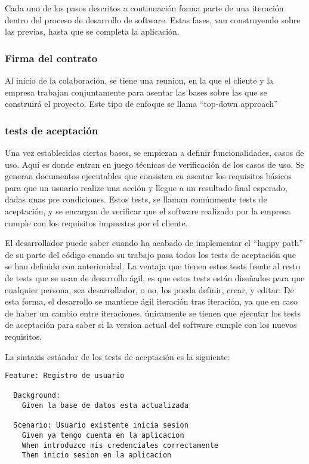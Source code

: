 \documentclass[12pt]{report} %
\begin{document}
Cada uno de los pasos descritos a continuación forma parte de una iteración dentro del proceso de desarrollo de software.
Estas fases, van construyendo sobre las previas, hasta que se completa la aplicación.

\subsubsection{Firma del contrato}

Al inicio de la colaboración, se tiene una reunion, en la que el cliente y la empresa trabajan conjuntamente para asentar las bases sobre las que se construirá el proyecto.
Este tipo de enfoque se llama ``top-down approach'' %

\subsubsection{tests de aceptación}

Una vez establecidas ciertas bases, se empiezan a definir funcionalidades, casos de uso.
Aquí es donde entran en juego técnicas de verificación de los casos de uso.
Se generan documentos ejecutables que consisten en asentar los requisitos básicos para que un usuario realize una acción y llegue a un resultado final esperado, dadas unas pre condiciones.
Estos tests, se llaman comúnmente tests de aceptación, y se encargan de verificar que el software realizado por la empresa cumple con los requisitos impuestos por el cliente.

El desarrollador puede saber cuando ha acabado de implementar el ``happy path'' de su parte del código cuando su trabajo pasa todos los tests de aceptación que se han definido con anterioridad.
La ventaja que tienen estos tests frente al resto de tests que se usan de desarrollo ágil, es que estos tests están diseñados para que cualquier persona, sea desarrollador, o no, los pueda definir, crear, y editar.
De esta forma, el desarrollo se mantiene ágil iteración tras iteración, ya que en caso de haber un cambio entre iteraciones, únicamente se tienen que ejecutar los tests de aceptación para saber si la version actual del software cumple con los nuevos requisitos.

La sintaxis estándar de los tests de aceptación es la siguiente:

\begin{lstlisting}
Feature: Registro de usuario

  Background:
    Given la base de datos esta actualizada

  Scenario: Usuario existente inicia sesion
    Given ya tengo cuenta en la aplicacion
    When introduzco mis credenciales correctamente
    Then inicio sesion en la aplicacion
\end{lstlisting}
\end{document}

